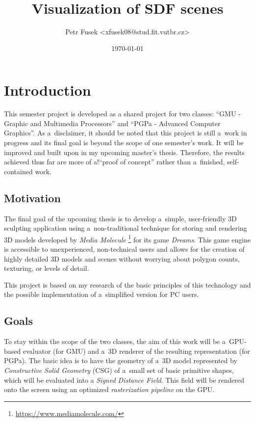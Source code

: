 \documentclass[11pt, a4paper]{article}
\title{Visualization of SDF scenes}
\author{Petr Fusek <xfusek08@stud.fit.vutbr.cz>}
\date{\today}
\renewcommand{\uv}[1]{``#1''}
\begin{document}
\maketitle

\section{Introduction}

This semester project is developed as a shared project for two classes: \uv{GMU - Graphic and Multimedia Processors} and \uv{PGPa - Advanced Computer Graphics}.
As a~disclaimer, it should be noted that this project is still a~work in progress and its final goal is beyond the scope of one semester's work. It will be improved and built upon in my upcoming master's thesis.
Therefore, the results achieved thus far are more of a!\uv{proof of concept} rather than a~finished, self-contained work.

\subsection{Motivation}

The final goal of the upcoming thesis is to develop a~simple, user-friendly 3D sculpting application using a~non-traditional technique for storing and rendering 3D models developed by \emph{Media Molecule} \footnote{\href{https://www.mediamolecule.com/}{https://www.mediamolecule.com/}} for its game \emph{Dreams}{\texttrademark}.
This game engine is accessible to unexperienced, non-technical users and allows for the creation of highly detailed 3D models and scenes without worrying about polygon counts, texturing, or levels of detail.

This project is based on my research of the basic principles of this technology and the possible implementation of a~simplified version for PC users.

\subsection{Goals}

To stay within the scope of the two classes, the aim of this work will be a~GPU-based evaluator (for GMU) and a~3D renderer of the resulting representation (for PGPa).
The basic idea is to have the geometry of a~3D model represented by \emph{Constructive Solid Geometry} (CSG) of a~small set of basic primitive shapes, which will be evaluated into a \emph{Signed Distance Field}. This field will be rendered onto the screen using an optimized \emph{rasterization pipeline} on the GPU.
\end{document}
